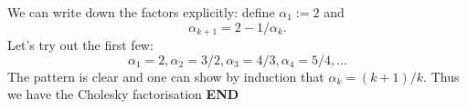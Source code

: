 \documentclass[12pt,a4paper]{article}
\begin{document}
We can  write down the factors explicitly: define $\ensuremath{\alpha}_1 := 2$ and
\[
\ensuremath{\alpha}_{k+1} = 2- 1/\ensuremath{\alpha}_k.
\]
Let's try out the first few:
\[
\ensuremath{\alpha}_1 = 2, \ensuremath{\alpha}_2 = 3/2, \ensuremath{\alpha}_3 = 4/3, \ensuremath{\alpha}_4 = 5/4, \ensuremath{\ldots}
\]
The pattern is clear and one can show by induction that $\ensuremath{\alpha}_k = (k+1)/k$. Thus we have the Cholesky factorisation
\textbf{END}
\end{document}
